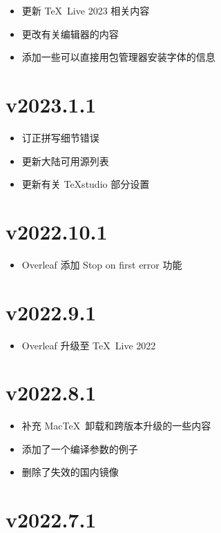 \begin{itemize}
  \item 更新 \TeX~Live 2023 相关内容
  \item 更改有关编辑器的内容
  \item 添加一些可以直接用包管理器安装字体的信息
\end{itemize}

\section*{v2023.1.1}

\begin{itemize}
  \item 订正拼写细节错误
  \item 更新大陆可用源列表
  \item 更新有关 \TeX studio 部分设置
\end{itemize}

\section*{v2022.10.1}

\begin{itemize}
  \item Overleaf 添加 Stop on first error 功能
\end{itemize}

\section*{v2022.9.1}

\begin{itemize}
  \item Overleaf 升级至 \TeX~Live 2022
\end{itemize}

\section*{v2022.8.1}

\begin{itemize}
  \item 补充 Mac\TeX\ 卸载和跨版本升级的一些内容
  \item 添加了一个编译参数的例子
  \item 删除了失效的国内镜像
\end{itemize}

\section*{v2022.7.1}

